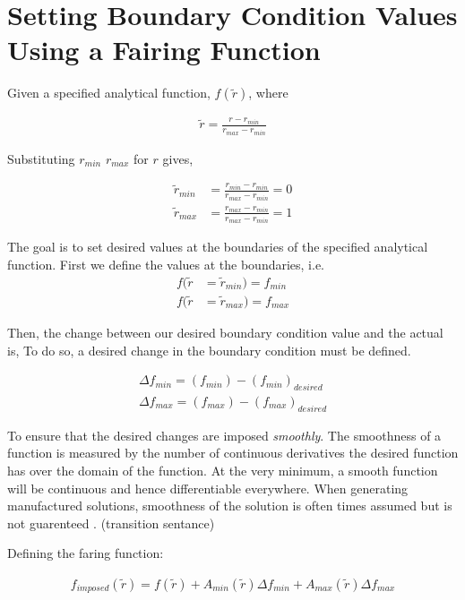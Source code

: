 \documentclass[a4paper]{article}
\begin{document}
\section{Setting Boundary Condition Values Using a Fairing Function}

Given a specified analytical function, $f(\widetilde{r})$, where  

\begin{align*}
    \widetilde{r} = \frac{r - r_{min}}{r_{max} - r_{min}} 
\end{align*}

Substituting $r_{min}$ $r_{max}$ for $r$ gives,

\begin{align*}
    \widetilde{r}_{min} &= \frac{r_{min} - r_{min}}{r_{max} - r_{min}} = 0\\
    \widetilde{r}_{max} &= \frac{r_{max} - r_{min}}{r_{max} - r_{min}} = 1
\end{align*}

The goal is to set desired values at the boundaries of the specified analytical
function. First we define the values at the boundaries, i.e.
\begin{align*}
    f(\widetilde{r} &= \widetilde{r}_{min}) = f_{min}     \\
    f(\widetilde{r} &= \widetilde{r}_{max}) = f_{max}     
\end{align*}

Then, the change between our desired boundary condition value and the actual is,
To do so, a desired change in the boundary condition must be defined. 

\begin{align*}
    \Delta f_{min} =  (f_{min}) - (f_{min})_{desired}   \\
    \Delta f_{max} =  (f_{max}) - (f_{max})_{desired}   
\end{align*}

To ensure that the desired changes are imposed \textit{smoothly}. The smoothness 
of a function is measured by the number of continuous derivatives the desired function
has over the domain of the function. At the very minimum, a smooth function will be continuous and
hence differentiable everywhere. When generating manufactured solutions, smoothness
of the solution is often times assumed but is not guarenteed 
\cite{oberkampf2002verification}. (transition sentance)

Defining the faring function:

\begin{align*}
    f_{imposed}(\widetilde{r}) = 
    f(\widetilde{r}) + 
    A_{min}(\widetilde{r}) \Delta f_{min} +
    A_{max}(\widetilde{r}) \Delta f_{max}  
\end{align*}
\end{document}
